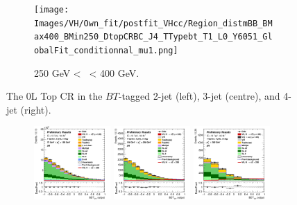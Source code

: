 \begin{figure}[h!]
\begin{subfigure}[b]{\textwidth}
        \texttt{[image: Images/VH/Own\_fit/postfit\_VHcc/Region\_distmBB\_BMax400\_BMin250\_DtopCRBC\_J4\_TTypebt\_T1\_L0\_Y6051\_GlobalFit\_conditionnal\_mu1.png]}
        \caption{250 GeV < \ptv\ < 400 GeV.}
        \label{fig:plots_VHcc_OL_250_TopCR_2c}
    \end{subfigure}
    \caption{The 0L Top CR in the $BT$-tagged 2-jet (left), 3-jet (centre), and 4-jet (right).}
    \label{fig:plots_VHcc_OL_TopCR_2c}
\end{figure} 

\vspace*{\fill} \newpage
\vspace*{\fill} 

\begin{figure}[h!]
    \centering
    \begin{subfigure}[b]{\textwidth}
        \centering
        \includegraphics[width=0.32\textwidth]{Images/VH/Own_fit/postfit_VHcc/Region_distmva_BMax150_BMin75_DSR_J2_TTypext_T2_L1_Y6051_GlobalFit_conditionnal_mu1.png}
        \includegraphics[width=0.32\textwidth]{Images/VH/Own_fit/postfit_VHcc/Region_distmva_BMax250_BMin150_DSR_J2_TTypext_T2_L1_Y6051_GlobalFit_conditionnal_mu1.png}
        \includegraphics[width=0.32\textwidth]{Images/VH/Own_fit/postfit_VHcc/Region_distmva_BMin250_DSR_J2_TTypext_T2_L1_Y6051_GlobalFit_conditionnal_mu1.png}

\end{subfigure}
\end{figure}

